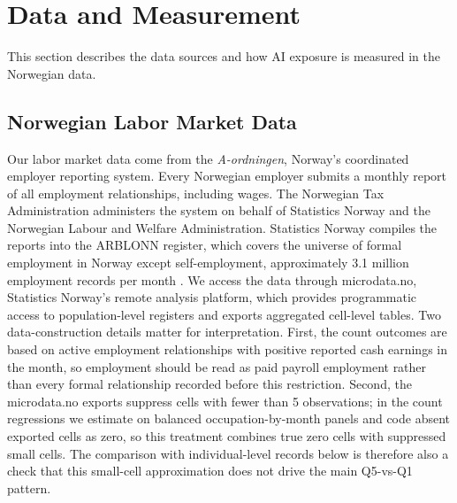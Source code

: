\documentclass[12pt]{article}
\begin{document}
\section{Data and Measurement}\label{sec:data}
This section describes the data sources and how AI exposure is measured in the Norwegian data.
\subsection{Norwegian Labor Market Data}\label{sec:data:labor}

Our labor market data come from the \emph{A-ordningen}, Norway's coordinated employer reporting system. Every Norwegian employer submits a monthly report of all employment relationships, including wages. The Norwegian Tax Administration administers the system on behalf of Statistics Norway and the Norwegian Labour and Welfare Administration. Statistics Norway compiles the reports into the ARBLONN register, which covers the universe of formal employment in Norway except self-employment, approximately 3.1 million employment records per month \citep{ssb_arblonn_doc}. We access the data through microdata.no, Statistics Norway's remote analysis platform, which provides programmatic access to population-level registers and exports aggregated cell-level tables. Two data-construction details matter for interpretation. First, the count outcomes are based on active employment relationships with positive reported cash earnings in the month, so employment should be read as paid payroll employment rather than every formal relationship recorded before this restriction. Second, the microdata.no exports suppress cells with fewer than 5 observations; in the count regressions we estimate on balanced occupation-by-month panels and code absent exported cells as zero, so this treatment combines true zero cells with suppressed small cells. The comparison with individual-level records below is therefore also a check that this small-cell approximation does not drive the main Q5-vs-Q1 pattern.
\end{document}
